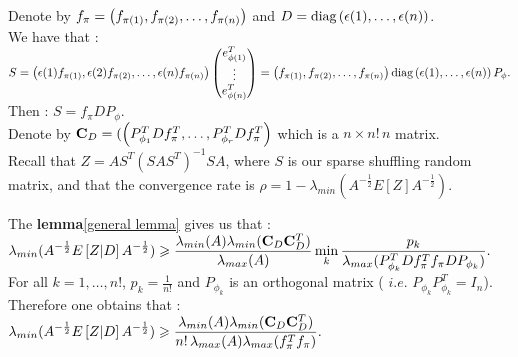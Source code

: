 Denote by $f_{\pi} = \left( f_{\pi(1)}, f_{\pi(2)},\dots, f_{\pi(n)} \right)$ and $D = \text{diag}\left(\epsilon(1),\dots,\epsilon(n)\right)$.\\
We have that :\\
$S = \left( \epsilon(1)f_{\pi(1)},\epsilon(2)f_{\pi(2)},\dots,\epsilon(n)f_{\pi(n)} \right) \begin{pmatrix} e_{\phi(1)}^{T} \\ \vdots \\ e_{\phi(n)}^{T} \end{pmatrix} = \left( f_{\pi(1)}, f_{\pi(2)},\dots, f_{\pi(n)} \right) \text{diag}\left(\epsilon(1),\dots,\epsilon(n)\right) P_{\phi}.$\\
Then : $S = f_{\pi} D P_{\phi}$.\\

Denote by $\bold{C}_{D} = (\left(P_{\phi_{1}}^{T} D f_{\pi}^{T},\dots,P_{\phi_{r}}^{T} D f_{\pi}^{T} \right) $ which is a $ n \times n! \,n$ matrix.\\


Recall that $Z = A S^{T} (S A S^{T})^{-1} S A$, where $S$ is our sparse shuffling random matrix, and that the convergence rate is  $\rho = 1 - \lambda_{min}(A^{-\frac12}E[Z]A^{-\frac12}  )$.\\

\pr

The \textbf{lemma}\ref{general lemma} gives us that :\\ 
$\displaystyle \lambda_{min}(A^{-\frac12}E\left[Z|D\right]A^{-\frac12} ) \geqslant \displaystyle  \frac{\lambda_{min}(A) \lambda_{min}(\bold{C}_{D} \bold{C}_{D}^{T})}{ \lambda_{max}(A)} \min_{k} \frac{p_{k}}{\lambda_{max}( P_{\phi_{k}}^{T} D f_{\pi}^{T} f_{\pi} D P_{\phi_{k}} )}.$\\
For all $k = 1,\dots,n!$, $p_{k} = \frac{1}{n!}$ and $P_{\phi_{k}}$ is an orthogonal matrix ( $i.e.$ $P_{\phi_{k}} P_{\phi_{k}}^{T} = I_{n}$). Therefore one obtains that :\\

$\displaystyle \lambda_{min}(A^{-\frac12}E\left[Z|D\right]A^{-\frac12} ) \geqslant \displaystyle  \frac{\lambda_{min}(A) \lambda_{min}(\bold{C}_{D} \bold{C}_{D}^{T})}{ n! \, \lambda_{max}(A) \lambda_{max}(f_{\pi}^{T} f_{\pi})}. $\\
 
